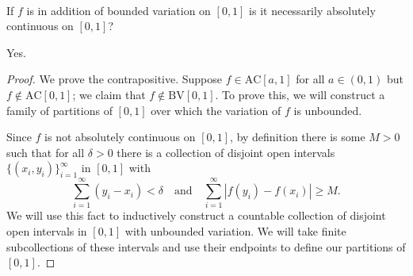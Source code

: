 \documentclass[12pt]{article}
\newlength{\myparskip}
\newenvironment{fullbox}{\begin{lrbox}{\savefullbox}\begin{minipage}{\dimexpr\textwidth-2\fboxsep\relax}\setlength{\parskip}{\myparskip}}{\end{minipage}\end{lrbox}\framebox[\textwidth]{\usebox{\savefullbox}}}
\newenvironment{pbox}[1][]{\begin{fullbox}\ifx#1\empty\else\paragraph{#1}\phantom{}\fi}{\end{fullbox}}
\theoremstyle{definition}
\newcommand{\isp}[1]{\quad\text{#1}\quad}
\newcommand{\<}{\langle}
\renewcommand{\>}{\rangle}
\begin{document}
\begin{pbox}
    If $f$ is in addition of bounded variation on $[0, 1]$ is it necessarily absolutely continuous on $[0, 1]$?
\end{pbox}

Yes.

\begin{proof}    
    We prove the contrapositive.
    Suppose $f \in \mathrm{AC}[a, 1]$ for all $a \in (0, 1)$ but $f \notin \mathrm{AC}[0, 1]$; we claim that $f \notin \mathrm{BV}[0, 1]$.
    To prove this, we will construct a family of partitions of $[0, 1]$ over which the variation of $f$ is unbounded.


    Since $f$ is not absolutely continuous on $[0, 1]$, by definition there is some $M > 0$ such that for all $\delta > 0$ there is a collection of disjoint open intervals $\{(x_i, y_i)\}_{i=1}^{\infty}$ in $[0, 1]$ with
    \[
        \sum_{i=1}^{\infty} (y_i - x_i) < \delta
        \isp{and}
        \sum_{i=1}^{\infty} |f(y_i) - f(x_i)| \geq M.
    \]
    We will use this fact to inductively construct a countable collection of disjoint open intervals in $[0, 1]$ with unbounded variation.
    We will take finite subcollections of these intervals and use their endpoints to define our partitions of $[0, 1]$.


\end{proof}
\end{document}
